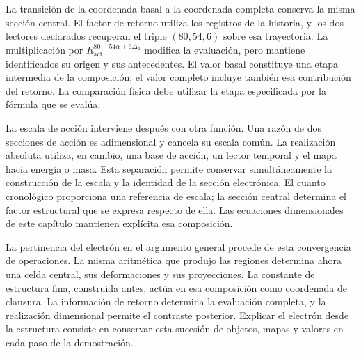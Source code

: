 La transición de la coordenada basal a la coordenada completa conserva
la misma sección central. El factor de retorno utiliza los registros
de la historia, y los dos lectores declarados recuperan el triple
$(80,54,6)$ sobre esa trayectoria. La multiplicación por
$R_{\mathrm{act}}^{80-54\alpha+6\Delta_4}$ modifica la evaluación,
pero mantiene identificados su origen y sus antecedentes. El valor
basal constituye una etapa intermedia de la composición; el valor
completo incluye también esa contribución del retorno. La comparación
física debe utilizar la etapa especificada por la fórmula que se evalúa.

La escala de acción interviene después con otra función. Una razón de
dos secciones de acción es adimensional y cancela su escala común.
La realización absoluta utiliza, en cambio, una base de acción, un
lector temporal y el mapa hacia energía o masa. Esta separación permite
conservar simultáneamente la construcción de la escala y la identidad
de la sección electrónica. El cuanto cronológico proporciona una
referencia de escala; la sección central determina el factor estructural
que se expresa respecto de ella. Las ecuaciones dimensionales de este
capítulo mantienen explícita esa composición.

La pertinencia del electrón en el argumento general procede de esta
convergencia de operaciones. La misma aritmética que produjo las
regiones determina ahora una celda central, sus deformaciones y sus
proyecciones. La constante de estructura fina, construida antes, actúa
en esa composición como coordenada de clausura. La información de
retorno determina la evaluación completa, y la realización dimensional
permite el contraste posterior. Explicar el electrón desde la estructura
consiste en conservar esta sucesión de objetos, mapas y valores en cada
paso de la demostración.
